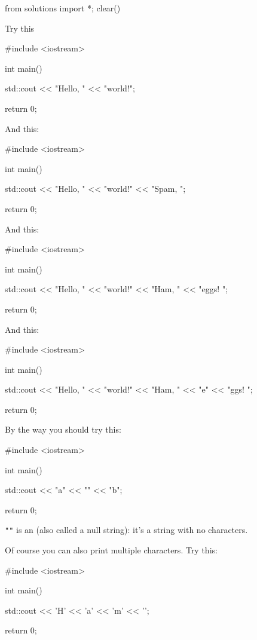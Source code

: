 \begin{python0}
from solutions import *; clear()
\end{python0}

Try this
\begin{console}
#include <iostream>

int main()
{
    std::cout << "Hello, " << "world!\n";

    return 0;
}
\end{console}
And this:
\begin{console}
#include <iostream>

int main()
{
	std::cout << "Hello, " << "world!\n"
                  << "Spam, \n";

	return 0;
}
\end{console}
And this:
\begin{console}
#include <iostream>

int main()
{
	std::cout << "Hello, " << "world!\n"
                  << "Ham, " << "eggs! \n";

	return 0;
}
\end{console}
And this:
\begin{console}
#include <iostream>

int main()
{
	std::cout << "Hello, " << "world!\n"
                  << "Ham, " << "e" << "ggs! \n";

	return 0;
}
\end{console}

By the way you should try this:
\begin{console}
#include <iostream>

int main()
{
    std::cout << "a" << "" << "b";

    return 0;
}
\end{console}

\verb!""! is an  (also called a null string): it's a string with no characters.






Of course you can also print multiple characters. Try this:
\begin{console}
#include <iostream>

int main()
{
    std::cout << 'H' << 'a' << 'm' << '\n';
         
    return 0;
}
\end{console}

